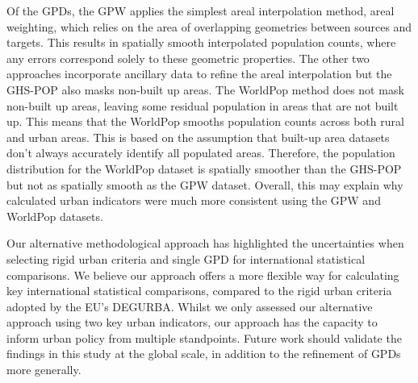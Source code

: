 \documentclass[review]{elsarticle}
\begin{document}
	
	Of the GPDs, the GPW applies the simplest areal interpolation method, areal weighting, which relies on the area of overlapping geometries between sources and targets. 
	This results in spatially smooth interpolated population counts, where any errors correspond solely to these geometric properties.
	The other two approaches incorporate ancillary data to refine the areal interpolation but the GHS-POP also masks non-built up areas.
	The WorldPop method does not mask non-built up areas, leaving some residual population in areas that are not built up.
	This means that the WorldPop smooths population counts across both rural and urban areas. 
	This is based on the assumption that built-up area datasets don’t always accurately identify all populated areas. 
	Therefore, the population distribution for the WorldPop dataset is spatially smoother than the GHS-POP but not as spatially smooth as the GPW dataset. 
	Overall, this may explain why calculated urban indicators were much more consistent using the GPW and WorldPop datasets.
	
	
	Our alternative methodological approach has highlighted the uncertainties when selecting rigid urban criteria and single GPD for international statistical comparisons.
	We believe our approach offers a more flexible way for calculating key international statistical comparisons, compared to the rigid urban criteria adopted by the EU's DEGURBA.
	Whilst we only assessed our alternative approach using two key urban indicators, our approach has the capacity to inform urban policy from multiple standpoints.
	Future work should validate the findings in this study at the global scale, in addition to the refinement of GPDs more generally.
	
	\newpage
	
	
	
\end{document}
